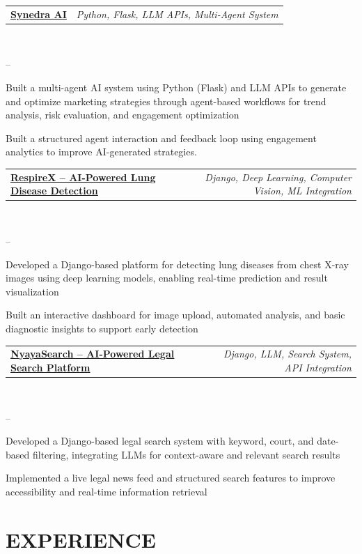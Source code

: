 \documentclass[9pt,a4paper]{extarticle}
\makeatletter
\newenvironment{dashlist}{%
\begin{list}{--}{%
\setlength{\leftmargin}{1.1em}
\setlength{\itemsep}{0pt}
\setlength{\parsep}{0pt}
\setlength{\topsep}{0pt}
\setlength{\labelsep}{0.3em}
}}{\end{list}}
\newcommand{\projentry}[2]{%
\noindent\begin{tabularx}{\linewidth}{@{}X r@{}}
\textbf{#1} & \textit{#2}
\end{tabularx}\vspace{0pt}}
\makeatother
\begin{document}
\vspace{1pt}

\projentry{\href{https://github.com/tusharneje-07/synedra-ai}{\underline{Synedra AI}}}{Python, Flask, LLM APIs, Multi-Agent System} \\[-8pt]
\begin{dashlist}
\item Built a multi-agent AI system using Python (Flask) and LLM APIs to generate and optimize marketing strategies through agent-based workflows for trend analysis, risk evaluation, and engagement optimization
\item Built a structured agent interaction and feedback loop using engagement analytics to improve AI-generated strategies.
\end{dashlist}

\vspace{1pt}

\projentry{\href{https://github.com/tusharneje-07/respirex}{\underline{RespireX -- AI-Powered Lung Disease Detection}}}{Django, Deep Learning, Computer Vision, ML Integration} \\[-8pt]
\begin{dashlist}
\item Developed a Django-based platform for detecting lung diseases from chest X-ray images using deep learning models, enabling real-time prediction and result visualization
\item Built an interactive dashboard for image upload, automated analysis, and basic diagnostic insights to support early detection
\end{dashlist}

\vspace{1pt}

\projentry{\href{https://github.com/tusharneje-07/nyayasearch}{\underline{NyayaSearch -- AI-Powered Legal Search Platform}}}{Django, LLM, Search System, API Integration} \\[-8pt]
\begin{dashlist}
\item Developed a Django-based legal search system with keyword, court, and date-based filtering, integrating LLMs for context-aware and relevant search results
\item Implemented a live legal news feed and structured search features to improve accessibility and real-time information retrieval
\end{dashlist}

\section{EXPERIENCE}
\end{document}
